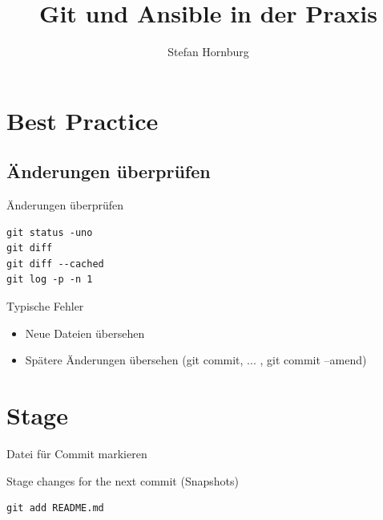 \title{Git und Ansible in der Praxis}
\author{Stefan Hornburg}
\date{}


\maketitle

\begin{frame}
  \titlepage
\end{frame}

\cleardoublepage

\tableofcontents

\cleardoublepage

\section{Best Practice}

\subsection{Änderungen überprüfen}

\begin{frame}[fragile]{Änderungen überprüfen}
\begin{lstlisting}
git status -uno
git diff
git diff --cached
git log -p -n 1
\end{lstlisting}
\end{frame}

\begin{frame}{Typische Fehler}
\begin{itemize}
\item Neue Dateien übersehen
\item Spätere Änderungen übersehen (git commit, ... , git commit --amend)
\end{itemize}
\end{frame}

\section{Stage}

\begin{frame}[fragile]{Datei für Commit markieren}

Stage changes for the next commit (Snapshots)

\begin{lstlisting}
git add README.md
\end{lstlisting}
\end{frame}

